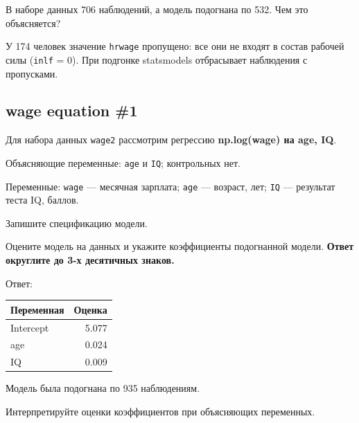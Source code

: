 \documentclass[
  russian,
]{article}
\newcounter{none} %
\begin{document}
В наборе данных 706 наблюдений, а модель подогнана по 532. Чем это
объясняется?

\begin{tcolorbox}[enhanced jigsaw, arc=.35mm, bottomrule=.15mm, bottomtitle=1mm, breakable, colback=white, colbacktitle=quarto-callout-tip-color!10!white, colframe=quarto-callout-tip-color-frame, coltitle=black, left=2mm, leftrule=.75mm, opacityback=0, opacitybacktitle=0.6, rightrule=.15mm, title=\textcolor{quarto-callout-tip-color}{\faLightbulb}\hspace{0.5em}{Ответ}, titlerule=0mm, toprule=.15mm, toptitle=1mm]

У 174 человек значение \texttt{hrwage} пропущено: все они не входят в
состав рабочей силы (\texttt{inlf} = 0). При подгонке statsmodels
отбрасывает наблюдения с пропусками.

\end{tcolorbox}

\subsection{wage equation \#1}\label{wage-equation-1}

Для набора данных \texttt{wage2} рассмотрим регрессию
\textbf{np.log(wage) на age, IQ}.

Объясняющие переменные: \texttt{age} и \texttt{IQ}; контрольных нет.

Переменные: \texttt{wage} --- месячная зарплата; \texttt{age} ---
возраст, лет; \texttt{IQ} --- результат теста IQ, баллов.

Запишите спецификацию модели.

Оцените модель на данных и укажите коэффициенты подогнанной модели.
\textbf{Ответ округлите до 3-х десятичных знаков.}

Ответ:

{\def\LTcaptype{none} %
\begin{longtable}[]{@{}lr@{}}
\toprule\noalign{}
Переменная & Оценка \\
\midrule\noalign{}
\endhead
\bottomrule\noalign{}
\endlastfoot
Intercept & 5.077 \\
age & 0.024 \\
IQ & 0.009 \\
\end{longtable}
}

Модель была подогнана по 935 наблюдениям.

Интерпретируйте оценки коэффициентов при объясняющих переменных.
\end{document}
